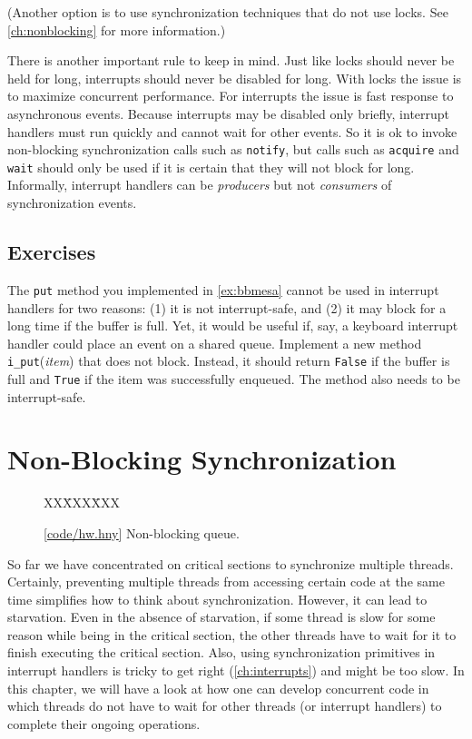 \documentclass{report}
\newcommand{\harmonysource}[1]{
\begin{tabbing}
XX\=XXX\=XXX\kill
    
\end{tabbing}
}
\newcommand{\harmonylink}[1]{%
[\href{https://harmony.cs.cornell.edu/#1}{\underline{#1}}]%
}
\newenvironment{code}{
\tcolorbox
}{
\endtcolorbox
}
\begin{document}
(Another option is to use synchronization techniques that do not use locks.
See \autoref{ch:nonblocking} for more information.)

There is another important rule to keep in mind.  Just like locks should never be held
for long, interrupts should never be disabled for long.  With locks the issue is to
maximize concurrent performance.  For interrupts the issue is fast response to
asynchronous events.  Because interrupts may be disabled only briefly, interrupt
handlers must run quickly and cannot wait for other events.  So it is ok to invoke
non-blocking synchronization calls such as \texttt{notify}, but calls such as
\texttt{acquire} and \texttt{wait} should only be used if it is certain that they will not
block for long.  Informally, interrupt handlers can be
\emph{producers} but not \emph{consumers} of synchronization events.

\section*{Exercises}
\begin{problems}
\item The \texttt{put} method you implemented in \autoref{ex:bbmesa} cannot be used
in interrupt handlers for two reasons: (1) it is not interrupt-safe, and (2)
it may block for a long time if the buffer is full.  Yet, it would be useful if,
say, a keyboard interrupt handler could place an event on a shared queue.
Implement a new method \texttt{i\_put}(\textit{item}) that does not
block.  Instead, it should return \texttt{False} if the buffer is full and \texttt{True}
if the item was successfully enqueued.
The method also needs to be interrupt-safe.
\end{problems}

\chapter{Non-Blocking Synchronization}
\label{ch:nonblocking}
%

%

\begin{figure}
\begin{code}
\harmonysource{hw}
\end{code}
\caption{\harmonylink{code/hw.hny} Non-blocking queue.}
\label{fig:hw}
\end{figure}

So far we have concentrated on critical sections to synchronize multiple
threads.  Certainly, preventing multiple threads from accessing
certain code at the same time simplifies how to think about synchronization.
However, it can lead to starvation.  Even in the absence of starvation,
if some thread is slow for some reason while being in the critical section,
the other threads have to wait for it to finish executing the critical section.
Also, using synchronization primitives in interrupt handlers is tricky
to get right (\autoref{ch:interrupts}) and might be too slow.
In this chapter, we will have a look at how one can develop concurrent
code in which threads do not have to wait for other threads (or interrupt
handlers) to complete their ongoing operations.
\end{document}
